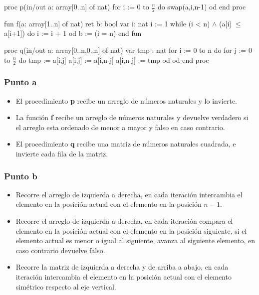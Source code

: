\begin{codebox}
\begin{pascallike}
proc p(in/out a: array[0..n] of nat)
    for i := 0 to $\frac{n}{2}$ do
        swap(a,i,n-1)
    od
end proc
\end{pascallike}
\end{codebox}

\begin{codebox}
\begin{pascallike}
fun f(a: array[1..n] of nat) ret b: bool
    var i: nat
    i := 1
    while (i < n) $\wedge$ (a[i] $\leq$ a[i+1]) do
        i := i + 1
    od
    b := (i = n)
end fun
\end{pascallike}
\end{codebox}

\begin{codebox}
\begin{pascallike}
proc q(in/out a: array[0..n,0..n] of nat)
    var tmp : nat
    for i := 0 to n do
        for j := 0 to $\frac{n}{2}$ do
            tmp := a[i,j]
            a[i,j] := a[i,n-j]
            a[i,n-j] := tmp
        od
    od
end proc
\end{pascallike}
\end{codebox}

\subsubsection{Punto a}
\begin{itemize}
    \item El procedimiento \textbf{p} recibe un arreglo de números naturales y lo invierte.
    \item La función \textbf{f} recibe un arreglo de números naturales y devuelve verdadero si el arreglo esta ordenado de menor a mayor y falso en caso contrario.
    \item El procedimiento \textbf{q} recibe una matriz de números naturales cuadrada, e invierte cada fila de la matriz.
\end{itemize}

\subsubsection{Punto b}
\begin{itemize}
    \item Recorre el arreglo de izquierda a derecha, en cada iteración intercambia el elemento en la posición actual con el elemento en la posición $n-1$.
    \item Recorre el arreglo de izquierda a derecha, en cada iteración compara el elemento en la posición actual con el elemento en la posición siguiente, si el elemento actual es menor o igual al siguiente, avanza al siguiente elemento, en caso contrario devuelve falso.
    \item Recorre la matriz de izquierda a derecha y de arriba a abajo, en cada iteración intercambia el elemento en la posición actual con el elemento simétrico respecto al eje vertical.
\end{itemize}

